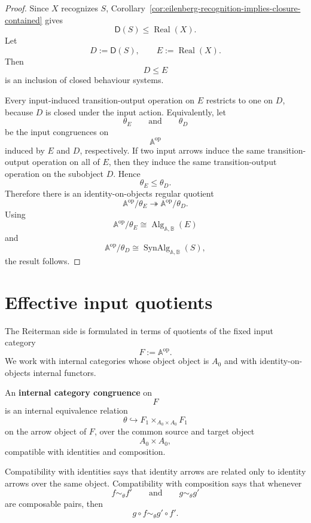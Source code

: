\begin{proof}
Since \(X\) recognizes \(S\), Corollary~\ref{cor:eilenberg-recognition-implies-closure-contained}
gives
\[
\mathsf D(S)\leq\operatorname{Real}(X).
\]
Let
\[
D:=\mathsf D(S),
\qquad
E:=\operatorname{Real}(X).
\]
Then
\[
D\leq E
\]
is an inclusion of closed behaviour systems.

Every input-induced transition-output operation on \(E\) restricts to one on
\(D\), because \(D\) is closed under the input action. Equivalently, let
\[
\theta_E
\qquad\text{and}\qquad
\theta_D
\]
be the input congruences on
\[
\mathbb A^{\mathrm{op}}
\]
induced by \(E\) and \(D\), respectively. If two input arrows induce the same
transition-output operation on all of \(E\), then they induce the same
transition-output operation on the subobject \(D\). Hence
\[
\theta_E\leq\theta_D.
\]
Therefore there is an identity-on-objects regular quotient
\[
\mathbb A^{\mathrm{op}}/\theta_E
\twoheadrightarrow
\mathbb A^{\mathrm{op}}/\theta_D.
\]
Using
\[
\mathbb A^{\mathrm{op}}/\theta_E
\cong
\operatorname{Alg}_{\mathbb A,\mathbb B}(E)
\]
and
\[
\mathbb A^{\mathrm{op}}/\theta_D
\cong
\operatorname{SynAlg}_{\mathbb A,\mathbb B}(S),
\]
the result follows.
\end{proof}

\section{Effective input quotients}
\label{sec:eilenberg-effective-input-quotients}

The Reiterman side is formulated in terms of quotients of the fixed input
category
\[
F:=\mathbb A^{\mathrm{op}}.
\]
We work with internal categories whose object object is \(A_0\) and with
identity-on-objects internal functors.

\begin{definition}
\label{def:eilenberg-internal-category-congruence}
An \textbf{internal category congruence} on
\[
F
\]
is an internal equivalence relation
\[
\theta\hookrightarrow
F_1\times_{A_0\times A_0}F_1
\]
on the arrow object of \(F\), over the common source and target object
\[
A_0\times A_0,
\]
compatible with identities and composition.

Compatibility with identities says that identity arrows are related only to
identity arrows over the same object. Compatibility with composition says
that whenever
\[
f\sim_\theta f'
\qquad\text{and}\qquad
g\sim_\theta g'
\]
are composable pairs, then
\[
g\circ f\sim_\theta g'\circ f'.
\]
\end{definition}

